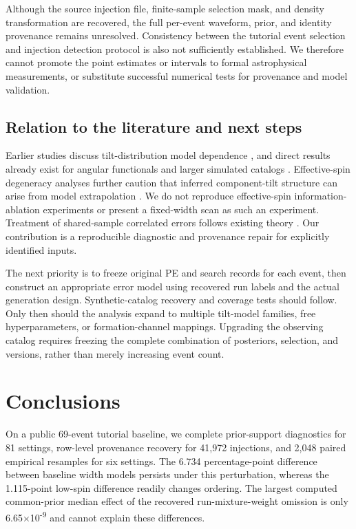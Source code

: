 \documentclass[a4paper,11pt]{article}
\begin{document}
Although the source injection file, finite-sample selection mask, and density transformation are recovered, the full per-event waveform, prior, and identity provenance remains unresolved. Consistency between the tutorial event selection and injection detection protocol is also not sufficiently established. We therefore cannot promote the point estimates or intervals to formal astrophysical measurements, or substitute successful numerical tests for provenance and model validation.

\subsection{Relation to the literature and next steps}\label{sec:9.3}
Earlier studies discuss tilt-distribution model dependence \cite{ref2}, and direct results already exist for angular functionals and larger simulated catalogs \cite{ref5}. Effective-spin degeneracy analyses further caution that inferred component-tilt structure can arise from model extrapolation \cite{ref6}. We do not reproduce effective-spin information-ablation experiments or present a fixed-width scan as such an experiment. Treatment of shared-sample correlated errors follows existing theory \cite{ref3,ref4}. Our contribution is a reproducible diagnostic and provenance repair for explicitly identified inputs.

The next priority is to freeze original PE and search records for each event, then construct an appropriate error model using recovered run labels and the actual generation design. Synthetic-catalog recovery and coverage tests should follow. Only then should the analysis expand to multiple tilt-model families, free hyperparameters, or formation-channel mappings. Upgrading the observing catalog requires freezing the complete combination of posteriors, selection, and versions, rather than merely increasing event count.

\FloatBarrier
\section{Conclusions}\label{sec:10}
On a public 69-event tutorial baseline, we complete prior-support diagnostics for 81 settings, row-level provenance recovery for 41,972 injections, and 2,048 paired empirical resamples for six settings. The 6.734 percentage-point difference between baseline width models persists under this perturbation, whereas the 1.115-point low-spin difference readily changes ordering. The largest computed common-prior median effect of the recovered run-mixture-weight omission is only 6.65\(\times\)10\textsuperscript{-9} and cannot explain these differences.
\end{document}
